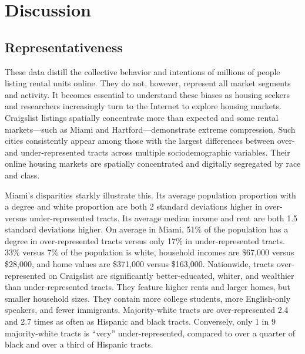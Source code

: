 \documentclass[11pt,onecolumn]{article} %
\begin{document}
\section{Discussion}

\subsection{Representativeness}

These data distill the collective behavior and intentions of millions of people listing rental units online. They do not, however, represent all market segments and activity. It becomes essential to understand these biases as housing seekers and researchers increasingly turn to the Internet to explore housing markets. Craigslist listings spatially concentrate more than expected and some rental markets---such as Miami and Hartford---demonstrate extreme compression. Such cities consistently appear among those with the largest differences between over- and under-represented tracts across multiple sociodemographic variables. Their online housing markets are spatially concentrated and digitally segregated by race and class.

Miami's disparities starkly illustrate this. Its average population proportion with a degree and white proportion are both 2 standard deviations higher in over- versus under-represented tracts. Its average median income and rent are both 1.5 standard deviations higher. On average in Miami, 51\% of the population has a degree in over-represented tracts versus only 17\% in under-represented tracts. 33\% versus 7\% of the population is white, household incomes are \$67,000 versus \$28,000, and home values are \$371,000 versus \$163,000. Nationwide, tracts over-represented on Craigslist are significantly better-educated, whiter, and wealthier than under-represented tracts. They feature higher rents and larger homes, but smaller household sizes. They contain more college students, more English-only speakers, and fewer immigrants. Majority-white tracts are over-represented 2.4 and 2.7 times as often as Hispanic and black tracts. Conversely, only 1 in 9 majority-white tracts is \enquote{very} under-represented, compared to over a quarter of black and over a third of Hispanic tracts.
\end{document}
